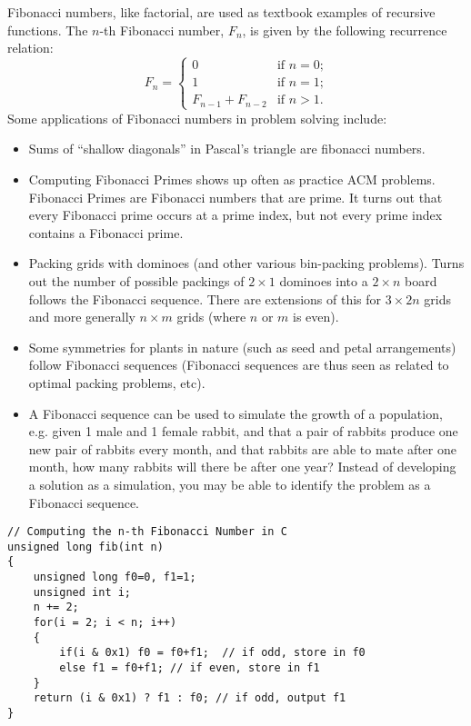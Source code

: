 Fibonacci numbers, like factorial, are used as textbook examples of recursive functions. The $n$-th Fibonacci number, $F_n$, is given by the following recurrence relation:
%
\[F_n = 
\begin{cases}
0 & \text{if $n=0$;}\\
1 & \text{if $n=1$;}\\
F_{n-1} + F_{n-2} & \text{if $n>1$.}
\end{cases}\]
%
Some applications of Fibonacci numbers in problem solving include:
\begin{itemize}
\item Sums of ``shallow diagonals'' in Pascal's triangle are fibonacci numbers.
\item Computing Fibonacci Primes shows up often as practice ACM problems. Fibonacci Primes are Fibonacci numbers that are prime. It turns out that every Fibonacci prime occurs at a prime index, but not every prime index contains a Fibonacci prime.
\item Packing grids with dominoes (and other various bin-packing problems). Turns out the number of possible packings of $2 \times 1$ dominoes into a $2 \times n$ board follows the Fibonacci sequence. There are extensions of this for $3 \times 2n$ grids and more generally $n \times m$ grids (where $n$ or $m$ is even). 
\item Some symmetries for plants in nature (such as seed and petal arrangements) follow Fibonacci sequences (Fibonacci sequences are thus seen as related to optimal packing problems, etc).
\item A Fibonacci sequence can be used to simulate the growth of a population, e.g. given 1 male and 1 female rabbit, and that a pair of rabbits produce one new pair of rabbits every month, and that rabbits are able to mate after one month, how many rabbits will there be after one year? Instead of developing a solution as a simulation, you may be able to identify the problem as a Fibonacci sequence.
\end{itemize}

\lstset{
	language=C,
	tabsize=4,
	basicstyle=\footnotesize,
}
\begin{lstlisting}
// Computing the n-th Fibonacci Number in C
unsigned long fib(int n) 
{
	unsigned long f0=0, f1=1;
	unsigned int i;
	n += 2;
	for(i = 2; i < n; i++)
	{
		if(i & 0x1) f0 = f0+f1;  // if odd, store in f0
		else f1 = f0+f1; // if even, store in f1
	}
	return (i & 0x1) ? f1 : f0; // if odd, output f1
}
\end{lstlisting}

